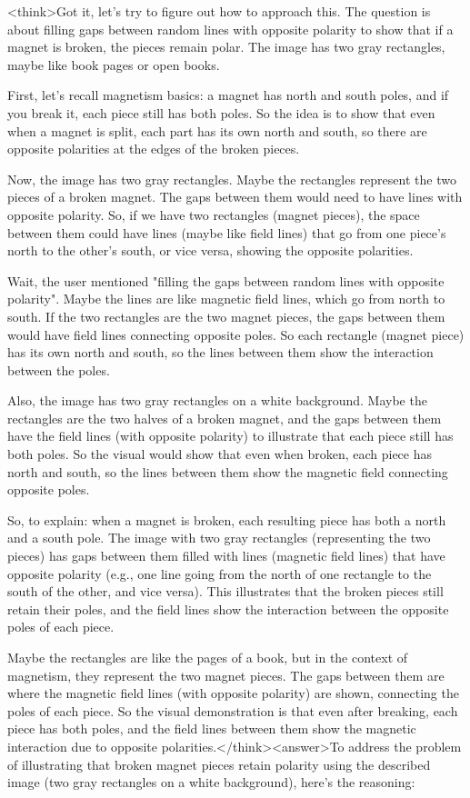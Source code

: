<think>Got it, let's try to figure out how to approach this. The question is about filling gaps between random lines with opposite polarity to show that if a magnet is broken, the pieces remain polar. The image has two gray rectangles, maybe like book pages or open books. 

First, let's recall magnetism basics: a magnet has north and south poles, and if you break it, each piece still has both poles. So the idea is to show that even when a magnet is split, each part has its own north and south, so there are opposite polarities at the edges of the broken pieces. 

Now, the image has two gray rectangles. Maybe the rectangles represent the two pieces of a broken magnet. The gaps between them would need to have lines with opposite polarity. So, if we have two rectangles (magnet pieces), the space between them could have lines (maybe like field lines) that go from one piece's north to the other's south, or vice versa, showing the opposite polarities. 

Wait, the user mentioned "filling the gaps between random lines with opposite polarity". Maybe the lines are like magnetic field lines, which go from north to south. If the two rectangles are the two magnet pieces, the gaps between them would have field lines connecting opposite poles. So each rectangle (magnet piece) has its own north and south, so the lines between them show the interaction between the poles. 

Also, the image has two gray rectangles on a white background. Maybe the rectangles are the two halves of a broken magnet, and the gaps between them have the field lines (with opposite polarity) to illustrate that each piece still has both poles. So the visual would show that even when broken, each piece has north and south, so the lines between them show the magnetic field connecting opposite poles. 

So, to explain: when a magnet is broken, each resulting piece has both a north and a south pole. The image with two gray rectangles (representing the two pieces) has gaps between them filled with lines (magnetic field lines) that have opposite polarity (e.g., one line going from the north of one rectangle to the south of the other, and vice versa). This illustrates that the broken pieces still retain their poles, and the field lines show the interaction between the opposite poles of each piece. 

Maybe the rectangles are like the pages of a book, but in the context of magnetism, they represent the two magnet pieces. The gaps between them are where the magnetic field lines (with opposite polarity) are shown, connecting the poles of each piece. So the visual demonstration is that even after breaking, each piece has both poles, and the field lines between them show the magnetic interaction due to opposite polarities.</think><answer>To address the problem of illustrating that broken magnet pieces retain polarity using the described image (two gray rectangles on a white background), here’s the reasoning:  

